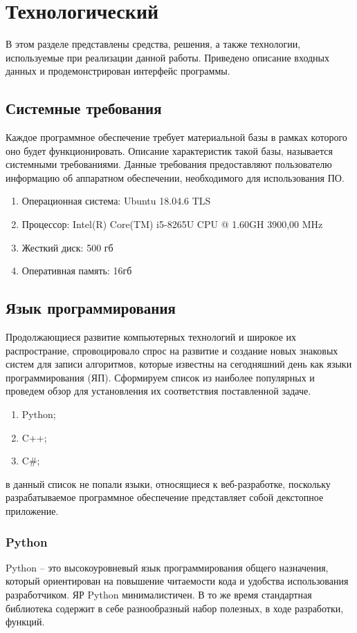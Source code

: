 \section{Технологический}
В этом разделе представлены средства, решения, а также технологии, используемые при реализации данной работы.
Приведено описание входных данных и продемонстрирован интерфейс программы.

\subsection{Системные требования}
Каждое программное обеспечение требует материальной базы в рамках которого оно будет функционировать.
Описание характеристик такой базы, называется системными требованиями.
Данные требования предоставляют пользователю информацию об аппаратном обеспечении, необходимого для использования ПО.
\begin{enumerate}
	\item Операционная система: Ubuntu 18.04.6 TLS
	\item Процессор: Intel(R) Core(TM) i5-8265U CPU @ 1.60GH	3900,00 MHz	
	\item Жесткий диск: 500 гб
	\item Оперативная память: 16гб
\end{enumerate}

\subsection{Язык программирования}
Продолжающиеся развитие компьютерных технологий и широкое их распространие, спровоцировало спрос на развитие и создание новых знаковых систем для записи алгоритмов, которые известны на сегодняшний день как языки программирования (ЯП).
Сформируем список из наиболее популярных и проведем обзор для установления их соответствия поставленной задаче.
\begin{enumerate}
	\item Python;
	\item C++;
	\item C\#;
\end{enumerate}
в данный список не попали языки, относящиеся к веб-разработке, поскольку разрабатываемое программное обеспечение представляет собой декстопное приложение.

\subsubsection{Python}
Python –  это высокоуровневый язык программирования общего назначения, который ориентирован на повышение читаемости кода и удобства использования разработчиком. 
ЯР Python минималистичен. 
В то же время стандартная библиотека содержит в себе разнообразный набор полезных, в ходе разработки, функций.

